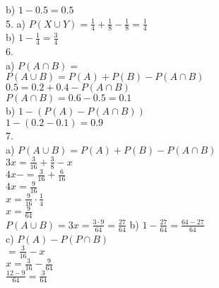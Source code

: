 \documentclass{article}
\begin{document}
  b) $1-0.5=0.5$\\
  5. a) $P(X\cup Y)=\frac{1}{4}+\frac{1}{8}-\frac{1}{8}=\frac{1}{4}$\\
  b) $1-\frac{1}{4}=\frac{3}{4}$\\
  6. \\
  a) $P(A\cap B)=$\\
  $P(A\cup B)=P(A)+P(B)-P(A\cap B)$\\
  $0.5=0.2+0.4-P(A\cap B)$\\
  $P(A\cap B)=0.6-0.5=0.1$\\
  b) $1-(P(A)-P(A\cap B))$\\
  $1-(0.2-0.1)=0.9$\\
  7. \\
  a) $P(A\cup B)=P(A)+P(B)-P(A\cap B)$\\
  $3x=\frac{3}{16}+\frac{3}{8}-x$\\
  $4x-=\frac{3}{16}+\frac{6}{16}$\\
  $4x=\frac{9}{16}$\\
  $x=\frac{9}{16}\cdot\displaystyle\frac{1}{4}$\\
  $x=\frac{9}{64}$\\
  $P(A\cup B)=3x=\frac{3\cdot9}{64}=\frac{27}{64}$
  b) $1-\frac{27}{64}=\frac{64-27}{64}$\\
  c) $P(A)-P(P\cap B)$\\
  $=\frac{3}{16}-x$\\
  $x=\frac{3}{16}-\frac{9}{64}$\\
  $\frac{12-9}{64}=\frac{3}{64}$\\
  

   
\end{document}
